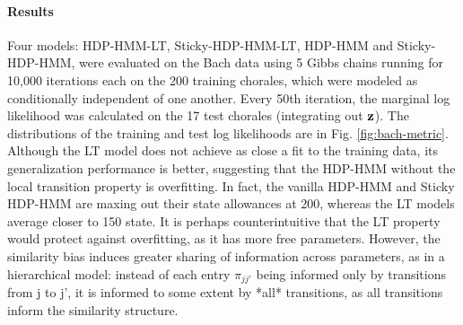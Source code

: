 \paragraph{Results}
\label{sec:results}

Four models: HDP-HMM-LT, Sticky-HDP-HMM-LT, HDP-HMM and
Sticky-HDP-HMM, were evaluated on the Bach data using 5 Gibbs chains
running for 10,000 iterations 
each on the 200 training chorales, which were modeled as conditionally independent
of one another.  Every 50th iteration, the
marginal log likelihood was calculated on the 17 test chorales
(integrating out $\mathbf{z}$).  The distributions of the training and test log
likelihoods are in Fig. \ref{fig:bach-metric}.  Although the LT
model does not achieve as close a fit to the training data, its
generalization performance is better, suggesting that the HDP-HMM
without the local transition property is overfitting.  In fact, the
vanilla HDP-HMM and Sticky HDP-HMM are maxing out their state
allowances at 200, whereas the LT models average closer to 150 state.
It is perhaps counterintuitive that the LT property would protect against
overfitting, as it has more free parameters.  However,
the similarity bias induces greater sharing of information across
parameters, as in a hierarchical model: instead of each entry
$\pi_{jj'}$ being informed only by transitions from j to j', it is 
informed to some extent by *all* transitions, as all transitions
inform the similarity structure.

